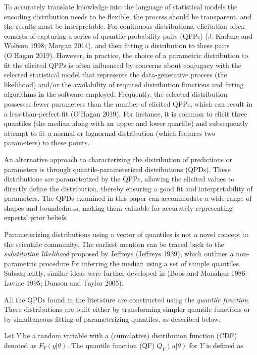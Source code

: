 \documentclass[
]{interact}
\begin{document}
To accurately translate knowledge into the language of statistical
models the encoding distribution needs to be flexible, the process
should be transparent, and the results must be interpretable. For
continuous distributions, elicitation often consists of capturing a
series of quantile-probability pairs (QPPs) (J. Kadane and Wolfson 1998;
Morgan 2014), and then fitting a distribution to these pairs (O'Hagan
2019). However, in practice, the choice of a parametric distribution to
fit the elicited QPPs is often influenced by concerns about conjugacy
with the selected statistical model that represents the data-generative
process (the likelihood) and/or the availability of required
distribution functions and fitting algorithms in the software employed.
Frequently, the selected distribution possesses fewer parameters than
the number of elicited QPPs, which can result in a less-than-perfect fit
(O'Hagan 2019). For instance, it is common to elicit three quantiles
(the median along with an upper and lower quartile) and subsequently
attempt to fit a normal or lognormal distribution (which features two
parameters) to these points.

An alternative approach to characterizing the distribution of
predictions or parameters is through quantile-parameterized
distributions (QPDs). These distributions are parameterized by the QPPs,
allowing the elicited values to directly define the distribution,
thereby ensuring a good fit and interpretability of parameters. The QPDs
examined in this paper can accommodate a wide range of shapes and
boundedness, making them valuable for accurately representing experts'
prior beliefs.

Parameterizing distributions using a vector of quantiles is not a novel
concept in the scientific community. The earliest mention can be traced
back to the \emph{substitution likelihood} proposed by Jeffreys
(Jeffreys 1939), which outlines a non-parametric procedure for inferring
the median using a set of sample quantiles. Subsequently, similar ideas
were further developed in (Boos and Monahan 1986; Lavine 1995; Dunson
and Taylor 2005).

All the QPDs found in the literature are constructed using the
\emph{quantile function}. These distributions are built either by
transforming simpler quantile functions or by simultaneous fitting of
parameterizing quantiles, as described below.

Let \(Y\) be a random variable with a (cumulative) distribution function
(CDF) denoted as \(F_Y(y\vert\theta)\). The quantile function (QF)
\(Q_Y(u\vert\theta)\) for \(Y\) is defined as
\end{document}
